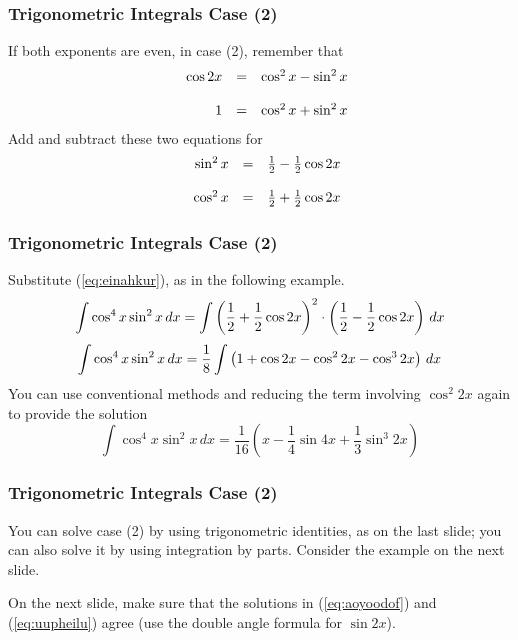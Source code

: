 \documentclass[xcolor=dvipsnames]{beamer}
\begin{document}
\begin{frame}
  \frametitle{Trigonometric Integrals Case (2)}
If both exponents are even, in case (2), remember that
  \begin{equation}
    \label{eq:ielahghu}
    \begin{array}{rcl}
      \cos{}2x & = & \cos^{2}x-\sin^{2}x \\
   \hspace{.5in} & & \\
      1 & = & \cos^{2}x+\sin^{2}x \\
    \end{array}
  \end{equation}
Add and subtract these two equations for
\begin{equation}
  \label{eq:einahkur}
  \begin{array}{rcl}
   \sin^{2}x & = & \frac{1}{2}-\frac{1}{2}\cos{}2x \\
   \hspace{.5in} & & \\
   \cos^{2}x & = & \frac{1}{2}+\frac{1}{2}\cos{}2x \\
  \end{array}
\end{equation}
\end{frame}

\begin{frame}
  \frametitle{Trigonometric Integrals Case (2)}
Substitute (\ref{eq:einahkur}), as in the following example.
\begin{equation}
  \label{eq:owamaela}
  \int\cos^{4}x\sin^{2}x\,dx=\int\left(\frac{1}{2}+\frac{1}{2}\cos{}2x\right)^{2}\cdot\left(\frac{1}{2}-\frac{1}{2}\cos{}2x\right)\,dx\notag
\end{equation}
\begin{equation}
  \label{eq:acahjahj}
  \int\cos^{4}x\sin^{2}x\,dx=\frac{1}{8}\int\left(1+\cos{}2x-\cos^{2}2x-\cos^{3}2x\right)\,dx\notag
\end{equation}
You can use conventional methods and reducing the term involving
$\cos^{2}2x$ again to provide the solution
\begin{equation}
  \label{eq:cohnalee}
  \int\cos^{4}x\sin^{2}x\,dx=\frac{1}{16}\left(x-\frac{1}{4}\sin{}4x+\frac{1}{3}\sin^{3}2x\right)
\end{equation}
\end{frame}

\begin{frame}
  \frametitle{Trigonometric Integrals Case (2)}
You can solve case (2) by using trigonometric identities, as on the
last slide; you can also solve it by using integration by parts. Consider
the example on the next slide.

\bigskip

On the next slide, make sure that the solutions in (\ref{eq:aoyoodof}) and
(\ref{eq:uupheilu}) agree (use the double angle formula for $\sin{}2x$).
\end{frame}
\end{document}
